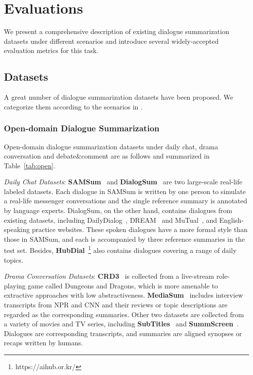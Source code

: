 \section{Evaluations}
\label{sec:evaluation}

We present a comprehensive description of existing dialogue summarization datasets 
under different scenarios and introduce several widely-accepted evaluation 
metrics for this task.

\subsection{Datasets}
\label{sec:dataset}

A great number of dialogue summarization datasets have been proposed. We categorize them according to the scenarios in . 


\subsubsection{Open-domain Dialogue Summarization}

Open-domain dialogue summarization datasets under daily chat, drama conversation and debate\&comment are as follows and summarized in Table~\ref{tab:open}.

\textit{Daily Chat Datasets}: \textbf{SAMSum}~\cite{gliwa2019samsum} and \textbf{DialogSum}~\cite{chen2021dialsumm} are two large-scale real-life labeled datasets. Each dialogue in SAMSum is written by one person to simulate a real-life 
messenger conversations and the single reference summary is annotated by 
language experts. DialogSum, on the other hand, contains dialogues from existing datasets, including DailyDialog~\cite{li2017dailydialog}, 
DREAM~\cite{sun2019dream} and MuTual~\cite{cui2020mutual}, and English-speaking practice websites. These spoken dialogues have a more formal style than those in SAMSum, and each is accompanied by three reference summaries in the test set.
Besides, \textbf{HubDial}~\footnote{https://aihub.or.kr/} also contains dialogues covering a range of daily topics.

 
\textit{Drama Conversation Datasets}: \textbf{CRD3}~\cite{rameshkumar2020storytelling} is collected from a live-stream role-playing game called Dungeons and Dragons, which is more amenable to extractive approaches with low abstractiveness.
 \textbf{MediaSum}~\cite{zhu2021mediasum} includes interview transcripts from 
NPR and CNN and their reviews or topic descriptions are regarded as the 
corresponding summaries.
Other two datasets are collected from a variety of movies and TV series, 
including \textbf{SubTitles}~\cite{malykh2020sumtitles} and 
\textbf{SummScreen}~\cite{chen2021summscreen}. Dialogues are corresponding 
transcripts, and summaries are aligned synopses or recaps 
written by humans.


